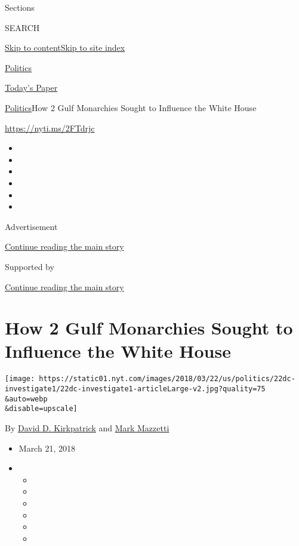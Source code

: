 Sections

SEARCH

\protect\hyperlink{site-content}{Skip to
content}\protect\hyperlink{site-index}{Skip to site index}

\href{https://www.nytimes.com/section/politics}{Politics}

\href{https://myaccount.nytimes.com/auth/login?response_type=cookie\&client_id=vi}{}

\href{https://www.nytimes.com/section/todayspaper}{Today's Paper}

\href{/section/politics}{Politics}\textbar{}How 2 Gulf Monarchies Sought
to Influence the White House

\url{https://nyti.ms/2FTdrjc}

\begin{itemize}
\item
\item
\item
\item
\item
\item
\end{itemize}

Advertisement

\protect\hyperlink{after-top}{Continue reading the main story}

Supported by

\protect\hyperlink{after-sponsor}{Continue reading the main story}

\hypertarget{how-2-gulf-monarchies-sought-to-influence-the-white-house}{%
\section{How 2 Gulf Monarchies Sought to Influence the White
House}\label{how-2-gulf-monarchies-sought-to-influence-the-white-house}}

\texttt{[image: https://static01.nyt.com/images/2018/03/22/us/politics/22dc-investigate1/22dc-investigate1-articleLarge-v2.jpg?quality=75\\\&auto=webp\\\&disable=upscale]}

By \href{https://www.nytimes.com/by/david-d-kirkpatrick}{David D.
Kirkpatrick} and \href{https://www.nytimes.com/by/mark-mazzetti}{Mark
Mazzetti}

\begin{itemize}
\item
  March 21, 2018
\item
  \begin{itemize}
  \item
  \item
  \item
  \item
  \item
  \item
  \end{itemize}
\end{itemize}

